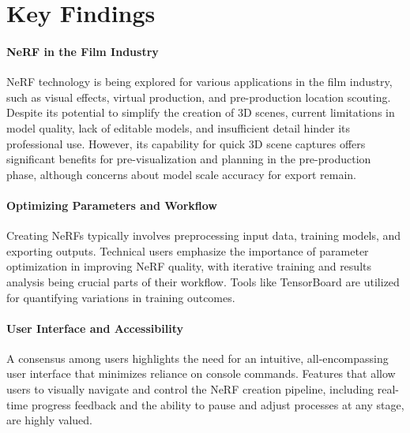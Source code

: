 \section{Key Findings}
\label{sec:user-research:findings}

\paragraph{NeRF in the Film Industry}
NeRF technology is being explored for various applications in the film industry, such as visual effects, virtual production, and pre-production location scouting. 
Despite its potential to simplify the creation of 3D scenes, current limitations in model quality, lack of editable models, and insufficient detail hinder its professional use. 
However, its capability for quick 3D scene captures offers significant benefits for pre-visualization and planning in the pre-production phase, although concerns about model scale accuracy for export remain. 
\cite{P2, P4}

\paragraph{Optimizing Parameters and Workflow}
Creating NeRFs typically involves preprocessing input data, training models, and exporting outputs. 
Technical users emphasize the importance of parameter optimization in improving NeRF quality, with iterative training and results analysis being crucial parts of their workflow.
Tools like TensorBoard are utilized for quantifying variations in training outcomes. 
\cite{P1, P3}

\paragraph{User Interface and Accessibility}
A consensus among users highlights the need for an intuitive, all-encompassing user interface that minimizes reliance on console commands. 
Features that allow users to visually navigate and control the NeRF creation pipeline, including real-time progress feedback and the ability to pause and adjust processes at any stage, are highly valued. 
\cite{P1, P2, P3}



